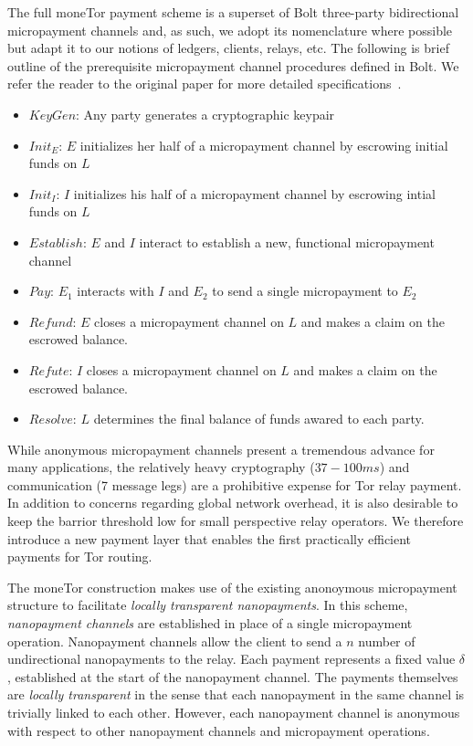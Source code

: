 The full moneTor payment scheme is a superset of Bolt three-party bidirectional
micropayment channels and, as such, we adopt its nomenclature where possible but
adapt it to our notions of ledgers, clients, relays, etc. The following is brief
outline of the prerequisite micropayment channel procedures defined in Bolt. We
refer the reader to the original paper for more detailed
specifications~\cite{green2017bolt}.

\begin{itemize}
\item $KeyGen$: Any party generates a cryptographic keypair
\item $Init_E$: $E$ initializes her half of a micropayment channel by escrowing
  initial funds on $L$
\item $Init_I$: $I$ initializes his half of a micropayment channel by
  escrowing intial funds on $L$
\item $Establish$: $E$ and $I$ interact to establish a new, functional
  micropayment channel
\item $Pay$: $E_1$ interacts with $I$ and $E_2$ to send a single micropayment to $E_2$
\item $Refund$: $E$ closes a micropayment channel on $L$ and makes a claim on
  the escrowed balance.
\item $Refute$: $I$ closes a micropayment channel on $L$ and makes a claim on
  the escrowed balance.
\item $Resolve$: $L$ determines the final balance of funds awared to
  each party.
\end{itemize}

While anonymous micropayment channels present a tremendous advance for many
applications, the relatively heavy cryptography ($37-100 ms$) and communication
(7 message legs) are a prohibitive expense for Tor relay payment. In addition to
concerns regarding global network overhead, it is also desirable to keep the
barrior threshold low for small perspective relay operators. We therefore
introduce a new payment layer that enables the first practically efficient
payments for Tor routing.

The moneTor construction makes use of the existing anonoymous micropayment
structure to facilitate \emph{locally transparent nanopayments}. In this scheme,
\emph{nanopayment channels} are established in place of a single micropayment
operation. Nanopayment channels allow the client to send a $n$ number of
undirectional nanopayments to the relay. Each payment represents a fixed value
$\delta$, established at the start of the nanopayment channel. The payments
themselves are \emph{locally transparent} in the sense that each nanopayment in
the same channel is trivially linked to each other. However, each nanopayment
channel is anonymous with respect to other nanopayment channels and micropayment
operations.

